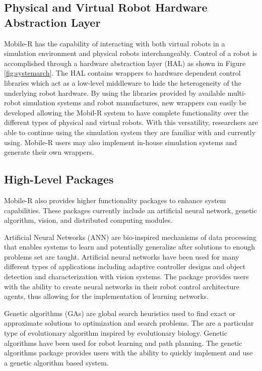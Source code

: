   \subsection{Physical and Virtual Robot Hardware Abstraction Layer} \label{sec:hal}
    Mobile-R has the capability of interacting with both virtual robots 
      in a simulation environment and physical robots interchangeably.
    Control of a robot is accomplished through a hardware abstraction
      layer (HAL) as shown in Figure \ref{fig:systemarch}.
    The HAL contains wrappers to hardware dependent control libraries which 
      act as a low-level middleware to hide the heterogeneity of the 
      underlying robot hardware.
    By using the libraries provided by available multi-robot simulation systems
      and robot manufactures, new wrappers can easily be developed allowing the 
      Mobil-R system to have complete functionality over the different
      types of physical and virtual robots.
    With this versatility, researchers are able to continue using the simulation 
      system they are familiar with and currently using.
    Mobile-R users may also implement in-house simulation systems and generate 
      their own wrappers.

  \subsection{High-Level Packages}
    Mobile-R also provides higher functionality packages to enhance 
      system capabilities.
    These packages currently include an artificial neural network, genetic 
      algorithm, vision, and distributed computing modules.

    Artificial Neural Networks (ANN) are bio-inspired mechanisms of data
      processing that enables systems to learn and potentially generalize after 
      solutions to enough problems set are taught.
    Artificial neural networks have been used for many different types of 
      applications including adaptive controller designs and object detection
      and characterization with vision systems.
    The package provides users with the ability to create neural 
      networks in their robot control architecture agents, thus allowing for
      the implementation of learning networks.

    Genetic algorithms (GAs) are global search heuristics used to find exact or
      approximate solutions to optimization and search problems.
    The are a particular type of evolutionary algorithm inspired by evolutionary
      biology.
    Genetic algorithms have been used for robot learning and path planning.
    The genetic algorithms package provides users with the ability to quickly
      implement and use a genetic algorithm based system.
      
